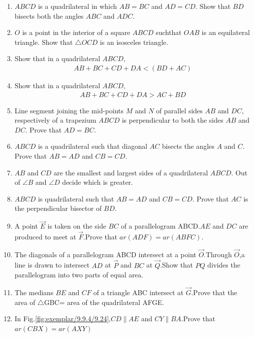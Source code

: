 \begin{enumerate}[label=\thesection.\arabic*,ref=\thesection.\theenumi]

\item $ABCD$ is a quadrilateral in which $AB = BC$ and $AD = CD$. Show that $BD$ bisects both the angles $ABC$ and $ADC$.
\item $O$ is a point in the interior of a square $ABCD$ suchthat $OAB$ is an equilateral triangle. Show that $\triangle  OCD$ is an isosceles triangle.
\item Show that in a quadrilateral $ABCD$, 
\begin{align}
     AB + BC + CD + DA  <  (BD + AC)
\end{align} 
\item Show that in a quadrilateral $ABCD$,
\begin{align}
 AB + BC + CD + DA  >   AC + BD
\end{align}
\item Line segment joining the mid-points $M$ and $N$ of parallel sides $AB$ and $DC$, respectively of a trapezium $ABCD$ is perpendicular to both the sides $AB$ and $DC$. Prove that $AD = BC$.
\item $ABCD$ is a quadrilateral such that diagonal $AC$ bisects the angles $A$ and $C$. Prove that $AB = AD$ and $CB = CD$.
\item $AB$ and $CD$ are the smallest and largest sides of a quadrilateral $ABCD$. Out of $\angle B$ and $\angle D$ decide which is greater.
\item $ABCD$ is quadrilateral such that $AB = AD$ and $CB = CD$. Prove that $AC$ is the perpendicular bisector of $BD$.
\item A point $\vec{E} $ is taken on the side $BC$ of a parallelogram ABCD.$AE$ and  $DC$ are produced to meet at $\vec{F}$.Prove that  $ar (ADF) = ar (ABFC)$.
\item The diagonals of a parallelogram ABCD intersect at a point $\vec{O}$.Through $\vec{O}$,a line is drawn to intersect $AD$ at $\vec{P}$ and $BC$ at $\vec{Q}$.Show that $PQ$ divides the parallelogram into two parts of equal area.
\item The medians $BE$ and $CF$ of a triangle ABC intersect at $\vec{G}$.Prove that the area of $ \triangle${GBC}= area of the quadrilateral AFGE.	
\item In Fig.\ref{fig:exemplar/9.9.4/9.24},$CD \parallel AE$  and $CY \parallel BA$.Prove that  $ar (CBX) =  ar (AXY)$

\end{enumerate}
